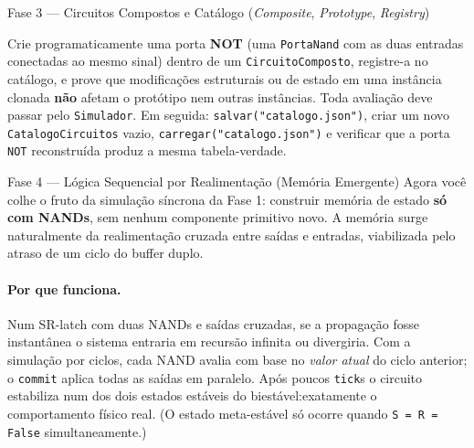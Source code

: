 \documentclass[11pt,a4paper]{article}
\begin{document}
\begin{phasebox}{Fase 3 — Circuitos Compostos e Catálogo (\textit{Composite}, \textit{Prototype}, \textit{Registry})}{}
\begin{acceptbox}
\vspace{2pt}
Crie programaticamente uma porta \textbf{NOT} (uma \texttt{PortaNand} com as duas entradas conectadas ao mesmo sinal) dentro de um \texttt{CircuitoComposto}, registre-a no catálogo, e prove que modificações estruturais ou de estado em uma instância clonada \textbf{não} afetam o protótipo nem outras instâncias. Toda avaliação deve passar pelo \texttt{Simulador}. Em seguida: \texttt{salvar("catalogo.json")}, criar um novo \texttt{CatalogoCircuitos} vazio, \texttt{carregar("catalogo.json")} e verificar que a porta \texttt{NOT} reconstruída produz a mesma tabela-verdade.
\end{acceptbox}
\end{phasebox}

\begin{phasebox}{Fase 4 — Lógica Sequencial por Realimentação (Memória Emergente)}{}
Agora você colhe o fruto da simulação síncrona da Fase 1: construir memória de estado \textbf{só com NANDs}, sem nenhum componente primitivo novo. A memória surge naturalmente da realimentação cruzada entre saídas e entradas, viabilizada pelo atraso de um ciclo do buffer duplo.

\paragraph{Por que funciona.} Num SR-latch com duas NANDs e saídas cruzadas, se a propagação fosse instantânea o sistema entraria em recursão infinita ou divergiria. Com a simulação por ciclos, cada NAND avalia com base no \emph{valor atual} do ciclo anterior; o \texttt{commit} aplica todas as saídas em paralelo. Após poucos \texttt{tick}s o circuito estabiliza num dos dois estados estáveis do biestável:exatamente o comportamento físico real. (O estado meta-estável só ocorre quando \texttt{S = R = False} simultaneamente.)


\end{phasebox}
\end{document}
